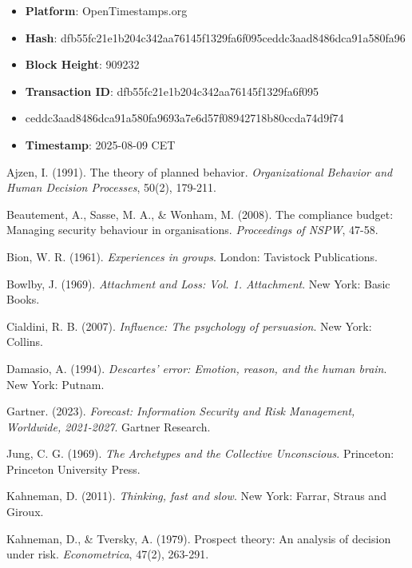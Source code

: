 \documentclass[11pt,a4paper]{article}
\begin{document}
\begin{itemize}
\item \textbf{Platform}: OpenTimestamps.org
\item \textbf{Hash}: dfb55fc21e1b204c342aa76145f1329fa6f095ceddc3aad8486dca91a580fa96
\item \textbf{Block Height}: 909232
\item \textbf{Transaction ID}: dfb55fc21e1b204c342aa76145f1329fa6f095
\item ceddc3aad8486dca91a580fa9693a7e6d57f08942718b80ccda74d9f74
\item \textbf{Timestamp}: 2025-08-09 CET

\end{itemize}

\begin{thebibliography}{99}

Ajzen, I. (1991). The theory of planned behavior. \textit{Organizational Behavior and Human Decision Processes}, 50(2), 179-211.

Beautement, A., Sasse, M. A., \& Wonham, M. (2008). The compliance budget: Managing security behaviour in organisations. \textit{Proceedings of NSPW}, 47-58.

Bion, W. R. (1961). \textit{Experiences in groups}. London: Tavistock Publications.

Bowlby, J. (1969). \textit{Attachment and Loss: Vol. 1. Attachment}. New York: Basic Books.

Cialdini, R. B. (2007). \textit{Influence: The psychology of persuasion}. New York: Collins.

Damasio, A. (1994). \textit{Descartes' error: Emotion, reason, and the human brain}. New York: Putnam.

Gartner. (2023). \textit{Forecast: Information Security and Risk Management, Worldwide, 2021-2027}. Gartner Research.

Jung, C. G. (1969). \textit{The Archetypes and the Collective Unconscious}. Princeton: Princeton University Press.

Kahneman, D. (2011). \textit{Thinking, fast and slow}. New York: Farrar, Straus and Giroux.

Kahneman, D., \& Tversky, A. (1979). Prospect theory: An analysis of decision under risk. \textit{Econometrica}, 47(2), 263-291.


\end{thebibliography}
\end{document}
